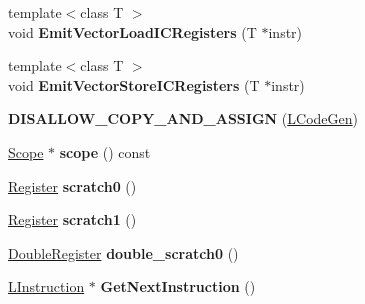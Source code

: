 \begin{DoxyCompactItemize}
\item 
{\footnotesize template$<$class T $>$ }\\void {\bfseries Emit\+Vector\+Load\+I\+C\+Registers} (T $\ast$instr)\hypertarget{classv8_1_1internal_1_1_l_code_gen_a31e396d22475d9c9dec1ac0e5030380a}{}\label{classv8_1_1internal_1_1_l_code_gen_a31e396d22475d9c9dec1ac0e5030380a}

\item 
{\footnotesize template$<$class T $>$ }\\void {\bfseries Emit\+Vector\+Store\+I\+C\+Registers} (T $\ast$instr)\hypertarget{classv8_1_1internal_1_1_l_code_gen_a84c9b0e87f89361233a5c74e43d689cb}{}\label{classv8_1_1internal_1_1_l_code_gen_a84c9b0e87f89361233a5c74e43d689cb}

\item 
{\bfseries D\+I\+S\+A\+L\+L\+O\+W\+\_\+\+C\+O\+P\+Y\+\_\+\+A\+N\+D\+\_\+\+A\+S\+S\+I\+GN} (\hyperlink{classv8_1_1internal_1_1_l_code_gen}{L\+Code\+Gen})\hypertarget{classv8_1_1internal_1_1_l_code_gen_a475eb7b3d7738263ae865905cf36b985}{}\label{classv8_1_1internal_1_1_l_code_gen_a475eb7b3d7738263ae865905cf36b985}

\item 
\hyperlink{classv8_1_1internal_1_1_scope}{Scope} $\ast$ {\bfseries scope} () const \hypertarget{classv8_1_1internal_1_1_l_code_gen_a2b85c964ccc4e59f50d49d19b0ed5ce0}{}\label{classv8_1_1internal_1_1_l_code_gen_a2b85c964ccc4e59f50d49d19b0ed5ce0}

\item 
\hyperlink{structv8_1_1internal_1_1_register}{Register} {\bfseries scratch0} ()\hypertarget{classv8_1_1internal_1_1_l_code_gen_a9ebee5eebe5fb0c13a6830fc3a0d96d5}{}\label{classv8_1_1internal_1_1_l_code_gen_a9ebee5eebe5fb0c13a6830fc3a0d96d5}

\item 
\hyperlink{structv8_1_1internal_1_1_register}{Register} {\bfseries scratch1} ()\hypertarget{classv8_1_1internal_1_1_l_code_gen_a157c35c333279efe87b7fcd036dd531d}{}\label{classv8_1_1internal_1_1_l_code_gen_a157c35c333279efe87b7fcd036dd531d}

\item 
\hyperlink{structv8_1_1internal_1_1_double_register}{Double\+Register} {\bfseries double\+\_\+scratch0} ()\hypertarget{classv8_1_1internal_1_1_l_code_gen_a4f5cc0bfde0e504263fc281ec4150e5c}{}\label{classv8_1_1internal_1_1_l_code_gen_a4f5cc0bfde0e504263fc281ec4150e5c}

\item 
\hyperlink{classv8_1_1internal_1_1_l_instruction}{L\+Instruction} $\ast$ {\bfseries Get\+Next\+Instruction} ()\hypertarget{classv8_1_1internal_1_1_l_code_gen_a3089f4ba7e1cc640f81ca419fb0d39fa}{}\label{classv8_1_1internal_1_1_l_code_gen_a3089f4ba7e1cc640f81ca419fb0d39fa}


\end{DoxyCompactItemize}
